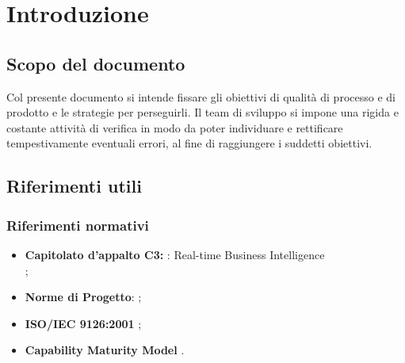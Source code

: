 
\section{Introduzione}
	
	\subsection{Scopo del documento}
		Col presente documento si intende fissare gli obiettivi di qualità di processo e di prodotto e le strategie per perseguirli. 
		Il team di sviluppo si impone una rigida e costante attività di verifica in modo da poter individuare e 
		rettificare tempestivamente eventuali errori, al fine di raggiungere i suddetti obiettivi.
		
	

	\subsection{Riferimenti utili}		

		\subsubsection{Riferimenti normativi}
			\begin{itemize}
				\item \textbf{Capitolato d'appalto C3:} \projectname{}: Real-time Business Intelligence \\
					;
				\item \textbf{Norme di Progetto}: ;
				\item \textbf{ISO/IEC 9126:2001} ;
				\item \textbf{Capability Maturity Model} .
			\end{itemize}
		

